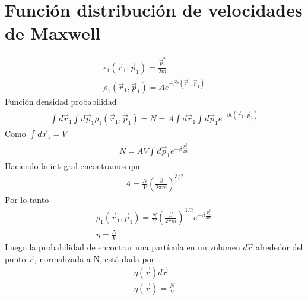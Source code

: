 \documentclass{article}
\begin{document}
\section{Función distribución de velocidades de Maxwell }
\begin{gather*}
  \epsilon_1 (\vec r _1; \vec p_1 ) = \displaystyle\frac{\vec p_1^2}{ 2m } \\
  \rho_1(\vec r_1, \vec p_1 ) = A e ^ {- \beta \epsilon(\vec r_1, \vec p_1 )}
\end{gather*}
Función densidad probabilidad 
\begin{gather*}
  \displaystyle\int_{}^{}d\vec r_1 \displaystyle\int_{}^{}d\vec p_1 \rho_1 (\vec r_1 , \vec p_1 ) = N = A \displaystyle\int_{}^{}d\vec r_1 \displaystyle\int_{}^{}d\vec p_1 e ^ {- \beta \epsilon(\vec r_1, \vec p_1 )}
\end{gather*}
Como $ \displaystyle\int_{}^{} d\vec r_1 = V  $
\begin{gather*}
  N = AV \displaystyle\int_{}^{}d\vec p_1 e ^ {- \beta \frac{p_1^2 }{2m }} 
\end{gather*}
Haciendo la integral encontramos que 
\begin{gather*}
  A = \frac{N }{V } \left(\frac{\beta}{2\pi m }\right)^ {3/2 }
\end{gather*}
Por lo tanto 
\begin{gather*}
  \rho_1 (\vec r_1, \vec p_1 ) = \frac{N}{V } \left(\frac{\beta}{2\pi m }\right)^ {3/2 } e ^ {- \beta \frac{p_1^2 }{2m }} \\
  \eta = \frac{N}{V }
\end{gather*}
Luego la probabilidad de encontrar una partícula en un volumen $ d\vec r  $ alrededor del punto $ \vec r  $, normalizada a N, está dada por 
\begin{gather*}
  \eta(\vec r ) d\vec r \\
  \eta (\vec r ) = \frac{N}{V }
\end{gather*}
\end{document}
